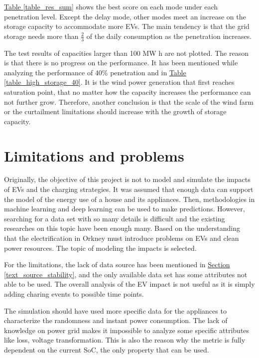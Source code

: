 \documentclass[12pt,a4paper]{report}
\begin{document}
        \hyperref[table_res_sum]{Table \ref*{table_res_sum}} shows the best score on each mode under each penetration level. Except the delay mode, other modes meet an increase on the storage capacity to accommodate more EVs. The main tendency is that the grid storage needs more than $\frac{2}{3}$ of the daily consumption as the penetration increases.

        The test results of capacities larger than 100 MW h are not plotted. The reason is that there is no progress on the performance. It has been mentioned while analyzing the performance of 40\% penetration and in \hyperref[table_high_storage_40]{Table \ref*{table_high_storage_40}}. It is the wind power generation that first reaches saturation point, that no matter how the capacity increases the performance can not further grow. Therefore, another conclusion is that the scale of the wind farm or the curtailment limitations should increase with the growth of storage capacity.

        \newpage
        \section{Limitations and problems}
        Originally, the objective of this project is not to model and simulate the impacts of EVs and the charging strategies. It was assumed that enough data can support the model of the energy use of a house and its appliances. Then, methodologies in machine learning and deep learning can be used to make predictions. However, searching for a data set with so many details is difficult and the existing researches on this topic have been enough many. Based on the understanding that the electrification in Orkney must introduce problems on EVs and clean power resources. The topic of modeling the impacts is selected.

        For the limitations, the lack of data source has been mentioned in \hyperref[text_source_stability]{Section \ref*{text_source_stability}}, and the only available data set has some attributes not able to be used. The overall analysis of the EV impact is not useful as it is simply adding charing events to possible time points.

        The simulation should have used more specific data for the appliances to characterize the randomness and instant power consumption. The lack of knowledge on power grid makes it impossible to analyze some specific attributes like loss, voltage transformation. This is also the reason why the metric is fully dependent on the current SoC, the only property that can be used.
\end{document}
